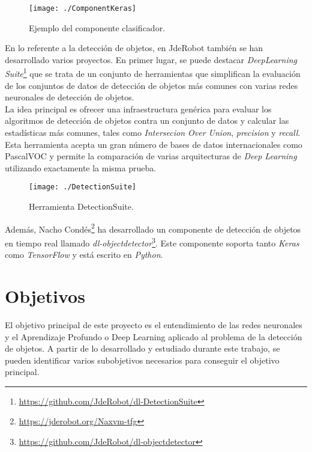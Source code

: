 \documentclass[a4paper, 12pt, oneside]{book}
\begin{document}
\begin{figure}[H]
\begin{center}
\texttt{[image: ./ComponentKeras]}
\caption{Ejemplo del componente clasificador.}
\label{ComponentKeras}
\end{center}
\end{figure}

En lo referente a la detección de objetos, en JdeRobot también se han desarrollado varios proyectos. En primer lugar, se puede destacar \textit{DeepLearning Suite}\footnote{\url{https://github.com/JdeRobot/dl-DetectionSuite}} que se trata de un conjunto de herramientas que simplifican la evaluación de los conjuntos de datos de detección de objetos más comunes con varias redes neuronales de detección de objetos.\\

La idea principal es ofrecer una infraestructura genérica para evaluar los algoritmos de detección de objetos contra un conjunto de datos y calcular las estadísticas más comunes, tales como \textit{Intersecion Over Union}, \textit{precision} y \textit{recall}. Esta herramienta acepta un gran número de bases de datos internacionales como PascalVOC y permite la comparación de varias arquitecturas de \textit{Deep Learning} utilizando exactamente la misma prueba.

\begin{figure}[H]
\begin{center}
\texttt{[image: ./DetectionSuite]}
\caption{Herramienta DetectionSuite.}
\label{DetectionSuite}
\end{center}
\end{figure}

Además, Nacho Condés\footnote{\url{https://jderobot.org/Naxvm-tfg}} ha desarrollado un componente de detección de objetos en tiempo real llamado \textit{dl-objectdetector}\footnote{\url{https://github.com/JdeRobot/dl-objectdetector}}. Este componente soporta tanto \textit{Keras} como \textit{TensorFlow} y está escrito en \textit{Python}.

\section{Objetivos}\label{Objetivos}

El objetivo principal de este proyecto es el entendimiento de las redes neuronales y el Aprendizaje Profundo o Deep Learning aplicado al problema de la detección de objetos. A partir de lo desarrollado y estudiado durante este trabajo, se pueden identificar varios subobjetivos necesarios para conseguir el objetivo principal. 
\end{document}
